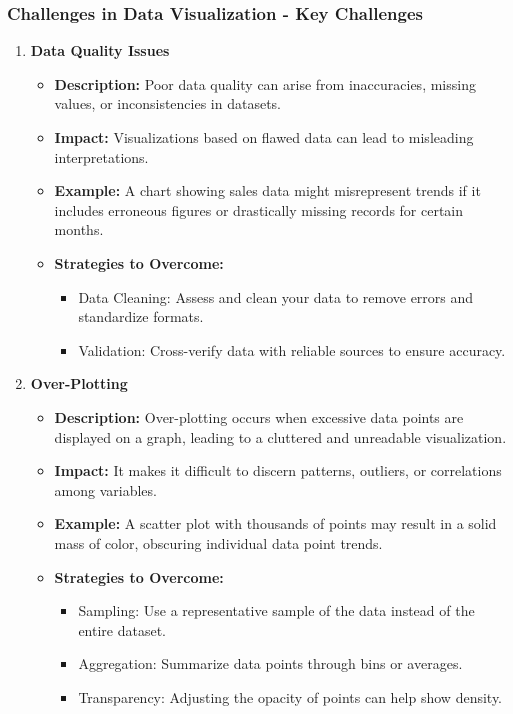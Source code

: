 \documentclass[aspectratio=169]{beamer}
\begin{document}
\begin{frame}[fragile]
    \frametitle{Challenges in Data Visualization - Key Challenges}
    \begin{enumerate}
        \item \textbf{Data Quality Issues}
        \begin{itemize}
            \item \textbf{Description:} Poor data quality can arise from inaccuracies, missing values, or inconsistencies in datasets.
            \item \textbf{Impact:} Visualizations based on flawed data can lead to misleading interpretations.
            \item \textbf{Example:} A chart showing sales data might misrepresent trends if it includes erroneous figures or drastically missing records for certain months.
            \item \textbf{Strategies to Overcome:}
            \begin{itemize}
                \item Data Cleaning: Assess and clean your data to remove errors and standardize formats.
                \item Validation: Cross-verify data with reliable sources to ensure accuracy.
            \end{itemize}
        \end{itemize}

        \item \textbf{Over-Plotting}
        \begin{itemize}
            \item \textbf{Description:} Over-plotting occurs when excessive data points are displayed on a graph, leading to a cluttered and unreadable visualization.
            \item \textbf{Impact:} It makes it difficult to discern patterns, outliers, or correlations among variables.
            \item \textbf{Example:} A scatter plot with thousands of points may result in a solid mass of color, obscuring individual data point trends.
            \item \textbf{Strategies to Overcome:}
            \begin{itemize}
                \item Sampling: Use a representative sample of the data instead of the entire dataset.
                \item Aggregation: Summarize data points through bins or averages.
                \item Transparency: Adjusting the opacity of points can help show density.
            \end{itemize}
        \end{itemize}
    \end{enumerate}
\end{frame}
\end{document}
